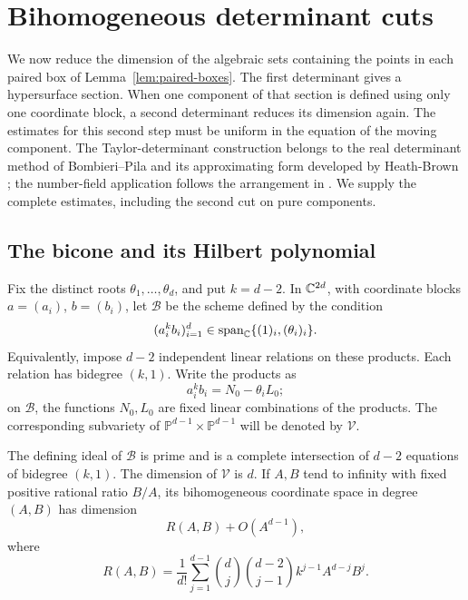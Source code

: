 \section{Bihomogeneous determinant cuts}
\label{sec:determinant-cuts}

We now reduce the dimension of the algebraic sets containing the points
in each paired box of Lemma~\ref{lem:paired-boxes}.  The first
determinant gives a hypersurface section.  When one component of that
section is defined using only one coordinate block, a second determinant
reduces its dimension again.  The estimates for this second step must be
uniform in the equation of the moving component.
The Taylor-determinant construction belongs to the real determinant
method of Bombieri--Pila and its approximating form developed by
Heath-Brown \cite{BombieriPila1989,HeathBrown2009Sums}; the
number-field application follows the arrangement in
\cite[Section~4]{Reuss2015PowerFree}. We supply the complete estimates,
including the second cut on pure components.

\subsection{The bicone and its Hilbert polynomial}

Fix the distinct roots \(\theta_1,\ldots,\theta_d\), and put \(k=d-2\).
In \(\mathbb C^{2d}\), with coordinate blocks \(a=(a_i)\), \(b=(b_i)\), let
\(\mathcal B\) be the scheme defined by the condition
\[
 (a_i^kb_i)_{i=1}^d
 \in \operatorname{span}_{\mathbb C}\{(1)_i,(\theta_i)_i\}.
\]
Equivalently, impose \(d-2\) independent linear relations on these
products.  Each relation has bidegree \((k,1)\).  Write the products as
\[
 a_i^kb_i=N_0-\theta_iL_0;
\]
on \(\mathcal B\), the functions \(N_0,L_0\) are fixed linear
combinations of the products.  The corresponding subvariety of
\(\mathbb P^{d-1}\times\mathbb P^{d-1}\) will be denoted by
\(\mathcal V\).

\begin{lemma}\label{lem:bicone}
The defining ideal of \(\mathcal B\) is prime and is a complete
intersection of \(d-2\) equations of bidegree \((k,1)\).
The dimension of \(\mathcal V\) is \(d\).  If \(A,B\) tend to infinity
with fixed positive rational ratio \(B/A\), its bihomogeneous coordinate
space in degree \((A,B)\) has dimension
\[
 R(A,B)+O(A^{d-1}),
\]
where
\begin{equation}
 R(A,B)=\frac1{d!}\sum_{j=1}^{d-1}
 \binom dj\binom{d-2}{j-1}k^{j-1}A^{d-j}B^j.
 \label{eq:hilbert-polynomial}
\end{equation}
\end{lemma}

